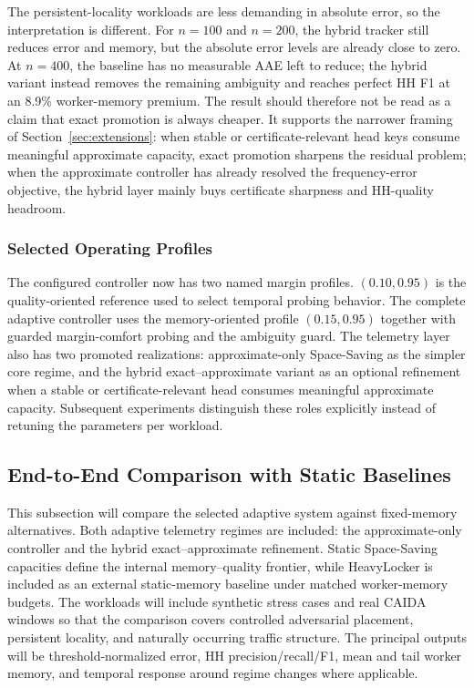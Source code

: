 \documentclass[sigconf, nonacm]{acmart}
\begin{document}
The persistent-locality workloads are less demanding in absolute error, so the
interpretation is different. For \(n=100\) and \(n=200\), the hybrid tracker
still reduces error and memory, but the absolute error levels are already close
to zero. At \(n=400\), the baseline has no measurable AAE left to reduce; the
hybrid variant instead removes the remaining ambiguity and reaches perfect HH
F1 at an 8.9\% worker-memory premium. The result should therefore not be read as
a claim that exact promotion is always cheaper. It supports the narrower
framing of Section~\ref{sec:extensions}: when stable or certificate-relevant
head keys consume meaningful approximate capacity, exact promotion sharpens the
residual problem; when the approximate controller has already resolved the
frequency-error objective, the hybrid layer mainly buys certificate sharpness
and HH-quality headroom.

\subsubsection{Selected Operating Profiles}
The configured controller now has two named margin profiles.
\((0.10,0.95)\) is the quality-oriented reference used to select temporal
probing behavior. The complete adaptive controller uses the memory-oriented
profile \((0.15,0.95)\) together with guarded margin-comfort probing and the
ambiguity guard. The telemetry layer also has two promoted realizations:
approximate-only Space-Saving as the simpler core regime, and the hybrid
exact--approximate variant as an optional refinement when a stable or
certificate-relevant head consumes meaningful approximate capacity. Subsequent
experiments distinguish these roles explicitly instead of retuning the
parameters per workload.

\subsection{End-to-End Comparison with Static Baselines}
\label{subsec:exp-end-to-end}
This subsection will compare the selected adaptive system against fixed-memory
alternatives. Both adaptive telemetry regimes are included: the approximate-only
controller and the hybrid exact--approximate refinement. Static Space-Saving
capacities define the internal memory--quality frontier, while HeavyLocker is
included as an external static-memory baseline under matched worker-memory
budgets. The workloads will include synthetic stress cases and real CAIDA
windows so that the comparison covers controlled adversarial placement,
persistent locality, and naturally occurring traffic structure. The principal
outputs will be threshold-normalized error, HH precision/recall/F1, mean and
tail worker memory, and temporal response around regime changes where
applicable.
\end{document}

